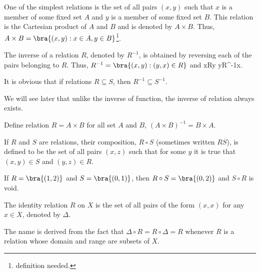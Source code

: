 \begin{example}
One of the simplest relations is the set of all pairs $(x,y)$ such that $x$ is a member of some fixed set $A$ and $y$ is a member of some fixed set $B$. This relation is the Cartesian product of $A$
and $B$ and is denoted by $A\times B$. Thus, $A\times B = \bra{(x,y):x\in A,y\in B}$\footnote{definition needed.}.
\end{example}


\begin{definition}
The inverse of a relation $R$, denoted by $R^{-1}$, is obtained by reversing each of the pairs belonging to $R$. Thus, $R^{-1} = \bra{(x,y): (y,x)\in R}$ and
\be
xRy \lra yR^{-1}x.
\ee
\end{definition}

\begin{remark}
It is obvious that if relations $R\subseteq S$, then $R^{-1} \subseteq S^{-1}$.

We will see later that unlike the inverse of function, the inverse of relation always exists.
\end{remark}

\begin{example}
Define relation $R = A\times B$ for all set $A$ and $B$, $(A\times B)^{-1} = B\times A$.
\end{example}


\begin{definition}
If $R$ and $S$ are relations, their composition, $R\circ S$ (sometimes written $RS$), is defined to be the set of all pairs $(x,z)$ such that for some $y$ it is true that $(x,y)\in S$ and $(y,z)\in R$.
\end{definition}

\begin{example}
If $R = \bra{(1,2)}$ and $S = \bra{(0,1)}$, then $R\circ S = \bra{(0,2)}$ and $S\circ R$ is void.
\end{example}



\begin{definition}
The identity relation $R$ on $X$ is the set of all pairs of the form $(x,x)$ for any $x\in X$, denoted by $\Delta$.

The name is derived from the fact that $\Delta \circ R = R\circ \Delta = R$ whenever $R$ is a relation whose domain and range are subsets of $X$.
\end{definition}

